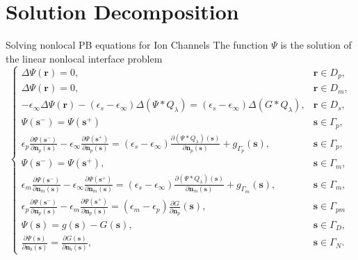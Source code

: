 \documentclass{beamer}
\newcommand{\rr}{{\mathbf r}}
\newcommand{\s}{{\mathbf s}}
\newcommand{\nn}{{\mathbf n}}
\begin{document}
\section{Solution Decomposition}
\begin{frame}{Solving nonlocal PB equations for Ion Channels}
   The function $ \Psi$ is the solution of the linear nonlocal interface problem
 \begin{equation}\label{eq:psi}
\left\{
\begin{array}{cl}
\Delta\Psi(\rr) = 0, & \rr \in D_p, \\
\Delta\Psi(\rr) = 0, & \rr \in D_m, \\
-\epsilon_\infty\Delta\Psi(\rr) -  (\epsilon_s-\epsilon_\infty)\Delta (\Psi \ast Q_{\lambda})=  (\epsilon_s-\epsilon_\infty)\Delta(G\ast Q_{\lambda}), & \rr \in D_s,\\
\Psi(\s^{-}) =\Psi(\s^{+})  &  \s\in\Gamma_p, \\
  \epsilon_p\frac{\partial\Psi(\s^{-})}{\partial \nn_p(\s)} -  \epsilon_{\infty}\frac{\partial\Psi(\s^{+})}{\partial \nn_p(\s)} 
 =  (\epsilon_s-\epsilon_\infty)\frac{\partial (\Psi \ast Q_{\lambda})(\s)}{\partial \nn_p(\s)} +g_{\Gamma_p}(\s), &  \s\in\Gamma_p,\\
 \Psi(\s^{-}) =\Psi(\s^{+}), &\s\in\Gamma_m, \\  
  \epsilon_m\frac{\partial\Psi(\s^{-})}{\partial \nn_m(\s)} -  \epsilon_{\infty}\frac{\partial\Psi(\s^{+})}{\partial \nn_m(\s)} 
 =  (\epsilon_s-\epsilon_\infty)\frac{\partial (\Psi \ast Q_{\lambda})(\s)}{\partial \nn_m(\s)} +g_{\Gamma_m}(\s), &  \s\in\Gamma_m,\\
 
\epsilon_p \frac{\partial \Psi (\s^{-})}{\partial \nn_p(\s)} - \epsilon_{m}\frac{\partial \Psi (\s^{+})}{\partial \nn_p(\s)} = (\epsilon_m - \epsilon_p) \frac{\partial G}{\partial \nn_p} (\s), & \s \in \Gamma_{pm} \\
\Psi(\s) = g(\s) - G(\s), & \s \in \Gamma_D, \\
\frac{\partial \Psi (\s)}{\partial \nn_b(\s)} = \frac{\partial G(\s)}{\partial \nn_b(\s)}, & \s \in \Gamma_N.
\end{array}
\right.
\end{equation}
\end{frame}
\end{document}
